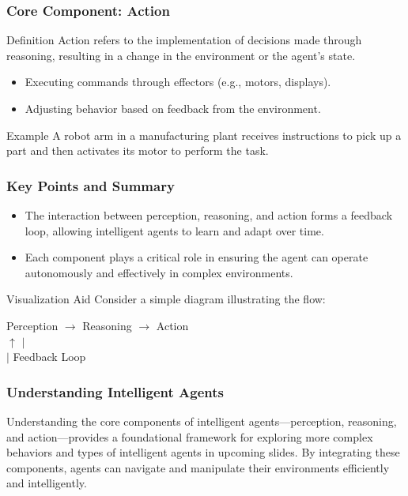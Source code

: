 \documentclass[aspectratio=169]{beamer}
\begin{document}
\begin{frame}[fragile]
  \frametitle{Core Component: Action}
  \begin{block}{Definition}
    Action refers to the implementation of decisions made through reasoning, resulting in a change in the environment or the agent's state.
  \end{block}
  
  \begin{itemize}
    \item Executing commands through effectors (e.g., motors, displays).
    \item Adjusting behavior based on feedback from the environment.
  \end{itemize}
  
  \begin{block}{Example}
    A robot arm in a manufacturing plant receives instructions to pick up a part and then activates its motor to perform the task.
  \end{block}
\end{frame}

\begin{frame}[fragile]
  \frametitle{Key Points and Summary}
  \begin{itemize}
    \item The interaction between perception, reasoning, and action forms a feedback loop, allowing intelligent agents to learn and adapt over time.
    \item Each component plays a critical role in ensuring the agent can operate autonomously and effectively in complex environments.
  \end{itemize}
  
  \begin{block}{Visualization Aid}
    Consider a simple diagram illustrating the flow:
    \begin{center}
      Perception  $\rightarrow$  Reasoning  $\rightarrow$  Action\\
      $\uparrow$                              $\vert$\\
      $\vert$                               Feedback Loop
    \end{center}
  \end{block}
\end{frame}

\begin{frame}[fragile]
  \frametitle{Understanding Intelligent Agents}
  Understanding the core components of intelligent agents—perception, reasoning, and action—provides a foundational framework for exploring more complex behaviors and types of intelligent agents in upcoming slides. By integrating these components, agents can navigate and manipulate their environments efficiently and intelligently.
\end{frame}
\end{document}
